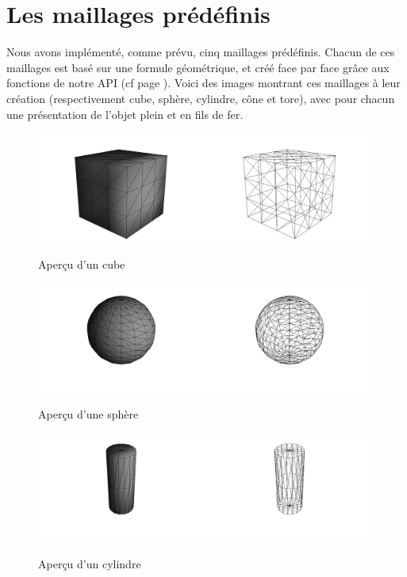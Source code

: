 \documentclass[a4paper]{memoir}
\begin{document}
		\section{Les maillages prédéfinis}
			Nous avons implémenté, comme prévu, cinq maillages prédéfinis. Chacun de ces maillages est basé sur une formule géométrique, et créé face par 
			face grâce aux fonctions de notre API (cf page \pageref{api-dev}). Voici des images montrant ces maillages à leur création (respectivement cube, 
			sphère, cylindre, cône et tore), avec pour chacun une présentation de l'objet plein et en fils de fer.
			\begin{figure}[H]
				\hspace{-2cm} \includegraphics[scale=0.27]{img/cube.png}
				\label{fig:interface}
				\caption{Aperçu d'un cube}
			\end{figure}
			\begin{figure}[H]
				\vspace{-0,5cm} \hspace{-2cm} \includegraphics[scale=0.27]{img/sphere.png}
				\label{fig:interface}
				\caption{Aperçu d'une sphère}
			\end{figure}
			\begin{figure}[H]
				\vspace{-0,5cm} \hspace{-2cm} \includegraphics[scale=0.27]{img/cylinder.png}
				\label{fig:interface}
				\caption{Aperçu d'un cylindre}
			\end{figure}
\end{document}
